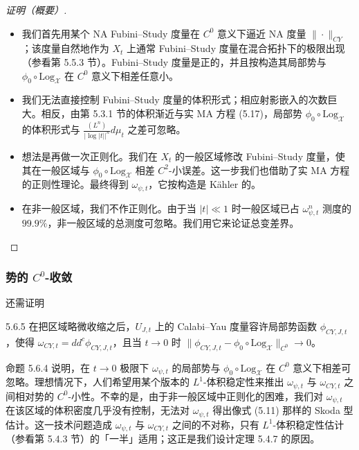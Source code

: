 \begin{proof}[证明（概要）]
\begin{itemize}
\item 我们首先用某个 NA Fubini--Study 度量在 $C^0$ 意义下逼近 NA 度量 $\|\cdot\|_{CY}$；该度量自然地作为 $X_t$ 上通常 Fubini--Study 度量在混合拓扑下的极限出现（参看第 5.5.3 节）。Fubini--Study 度量是正的，并且按构造其局部势与 $\phi_0\circ\mathrm{Log}_{\mathcal X}$ 在 $C^0$ 意义下相差任意小。
\item 我们无法直接控制 Fubini--Study 度量的体积形式；相应射影嵌入的次数巨大。相反，由第 5.3.1 节的体积渐近与实 MA 方程 (5.17)，局部势 $\phi_0\circ\mathrm{Log}_{\mathcal X}$ 的体积形式与 $\frac{(L^n)}{|\log|t||^n}d\mu_t$ 之差可忽略。
\item 想法是再做一次正则化。我们在 $X_t$ 的一般区域修改 Fubini--Study 度量，使其在一般区域与 $\phi_0\circ\mathrm{Log}_{\mathcal X}$ 相差 $C^2$-小误差。这一步我们也借助了实 MA 方程的正则性理论。最终得到 $\omega_{\psi,t}$，它按构造是 Kähler 的。
\item 在非一般区域，我们不作正则化。由于当 $|t|\ll 1$ 时一般区域已占 $\omega_{\psi,t}^n$ 测度的 $99.9\%$，非一般区域的总测度可忽略。我们用它来论证总变差界。\proofend
\end{itemize}
\end{proof}


\subsubsection{势的 $C^0$-收敛}
还需证明

\begin{proposition}{5.6.5}
在把区域略微收缩之后，$U_{J,t}$ 上的 Calabi--Yau 度量容许局部势函数 $\phi_{CY,J,t}$，使得 $\omega_{CY,t}=dd^c\phi_{CY,J,t}$，且当 $t\to 0$ 时 $\|\phi_{CY,J,t}-\phi_0\circ\mathrm{Log}_{\mathcal X}\|_{C^0}\to 0$。
\end{proposition}

命题 5.6.4 说明，在 $t\to 0$ 极限下 $\omega_{\psi,t}$ 的局部势与 $\phi_0\circ\mathrm{Log}_{\mathcal X}$ 在 $C^0$ 意义下相差可忽略。理想情况下，人们希望用某个版本的 $L^1$-体积稳定性来推出 $\omega_{\psi,t}$ 与 $\omega_{CY,t}$ 之间相对势的 $C^0$-小性。不幸的是，由于非一般区域中正则化的困难，我们对 $\omega_{\psi,t}$ 在该区域的体积密度几乎没有控制，无法对 $\omega_{\psi,t}$ 得出像式 (5.11) 那样的 Skoda 型估计。这一技术问题造成 $\omega_{\psi,t}$ 与 $\omega_{CY,t}$ 之间的不对称，只有 $L^1$-体积稳定性估计（参看第 5.4.3 节）的「一半」适用；这正是我们设计定理 5.4.7 的原因。

